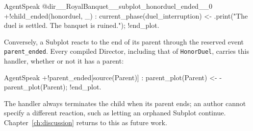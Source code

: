 \begin{codeblock}[]{AgentSpeak}
@dir__RoyalBanquet__subplot_honorduel_ended__0
+!child_ended(honorduel, _) : current_phase(duel_interruption) <-
    .print("The duel is settled. The banquet is ruined.");
    !end_plot.
\end{codeblock}
 
Conversely, a Subplot reacts to the end of its parent through the reserved event \lstinline|parent_ended|. Every compiled Director, including that of \lstinline|HonorDuel|, carries this handler, whether or not it has a parent:
 
\begin{codeblock}[]{AgentSpeak}
+!parent_ended[source(Parent)] : parent_plot(Parent) <-
    -parent_plot(Parent);
    !end_plot.
\end{codeblock}
 
The handler always terminates the child when its parent ends; an author cannot specify a different reaction, such as letting an orphaned Subplot continue. Chapter~\ref{ch:discussion} returns to this as future work.
